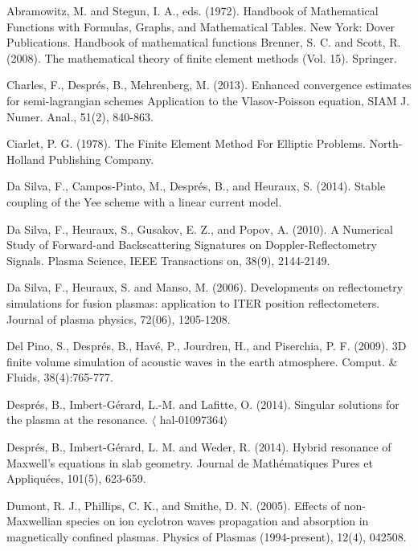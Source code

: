 \documentclass[proc]{edpsmath}
\begin{document}
\begin{thebibliography}{99}
	
	
 Abramowitz, M. and Stegun, I. A., eds. (1972). Handbook of Mathematical Functions with Formulas, Graphs, and Mathematical Tables. New York: Dover Publications.
	Handbook of mathematical functions
 Brenner, S. C. and Scott, R. (2008). The mathematical theory of finite element methods (Vol. 15). Springer.

Charles, F., Despr\'es, B., Mehrenberg, M.  (2013).  
Enhanced convergence estimates for semi-lagrangian schemes Application to the Vlasov-Poisson equation, SIAM J. Numer. Anal., 51(2), 840-863.

Ciarlet, P. G. (1978).  The Finite Element Method For Elliptic Problems. North-Holland Publishing Company.


 Da Silva, F., Campos-Pinto, M., Després, B., and Heuraux, S. (2014). Stable coupling of the Yee scheme with a linear current model.

 Da Silva, F., Heuraux, S., Gusakov, E. Z., and Popov, A. (2010). A Numerical Study of Forward-and Backscattering Signatures on Doppler-Reflectometry Signals. Plasma Science, IEEE Transactions on, 38(9), 2144-2149.



 Da Silva, F., Heuraux, S. and  Manso, M. (2006). Developments on reflectometry simulations for fusion plasmas: application to ITER position reflectometers. Journal of plasma physics, 72(06), 1205-1208.


Del Pino, S., Despr\'es, B., Hav\'e, P., Jourdren, H., and Piserchia, P. F. (2009). 3D finite
volume simulation of acoustic waves in the earth atmosphere.
Comput. \&
Fluids, 38(4):765-777.

Despr\'es, B., Imbert-G\'erard, L.-M. and Lafitte, O. (2014). Singular solutions for the plasma at the resonance. $\langle$ hal-01097364$\rangle$


 Després, B., Imbert-Gérard, L. M. and Weder, R. (2014). Hybrid resonance of Maxwell's equations in slab geometry. Journal de Mathématiques Pures et Appliquées, 101(5), 623-659.



 Dumont, R. J., Phillips, C. K., and Smithe, D. N. (2005). Effects of non-Maxwellian species on ion cyclotron waves propagation and absorption in magnetically confined plasmas. Physics of Plasmas (1994-present), 12(4), 042508.


\end{thebibliography}
\end{document}
